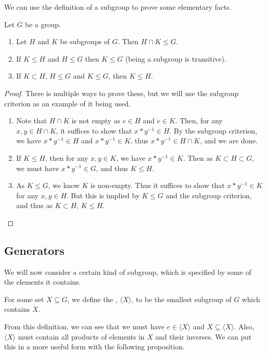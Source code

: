 \documentclass[a4]{scrreprt}
\newcommand{\newsubsection}{\subsection}
\begin{document}
We can use the definition of a subgroup to prove some elementary facts.
\begin{proposition}
	Let $G$ be a group.
	\begin{enumerate}[label=(\roman*)]
		\item Let $H$ and $K$ be subgroups of $G$. Then $H \cap K \leq G$.
		\item If $K \leq H$ and $H \leq G$ then $K \leq G$ (being a subgroup is transitive).
		\item If $K \subset H$, $H \leq G$ and $K \leq G$, then $K \leq H$. 
	\end{enumerate}
\end{proposition}
\begin{proof} There is multiple ways to prove these, but we will use the subgroup criterion as an example of it being used.\phantom{\qedhere}
	\begin{enumerate}[label=(\roman*)]
		\item Note that $H \cap K$ is not empty as $e \in H$ and $e \in K$. Then, for any $x, y \in H \cap K$, it suffices to show that $x * y^{-1} \in H$. By the subgroup criterion, we have $x * y^{-1} \in H$ and $x*y^{-1} \in K$, thus $x * y^{-1} \in H \cap K$, and we are done.
		\item If $K \leq H$, then for any $x, y \in K$, we have $x * y^{-1} \in K$. Then as $K \subset H \subset G$, we must have $x * y^{-1} \in G$, and thus $K \leq H$.
		\item As $K \leq G$, we know $K$ is non-empty. Thus it suffices to show that $x * y^{-1} \in K$ for any $x, y \in H$. But this is implied by $K \leq G$ and the subgroup criterion, and thus as $K \subset H$, $K \leq H$. \hfill \qedsymbol
	\end{enumerate}
\end{proof}

\newsubsection{Generators}

We will now consider a certain kind of subgroup, which is specified by some of the elements it contains.

\begin{definition}
	For some set $X \subseteq G$, we define the , $\langle X \rangle$, to be the smallest subgroup of $G$ which contains $X$.
\end{definition}

From this definition, we can see that we must have $e \in \langle X \rangle$ and $X \subseteq \langle X\rangle$. Also, $\langle X \rangle$ must contain all products of elements in $X$ and their inverses.
We can put this in a more useful form with the following proposition.
\end{document}
